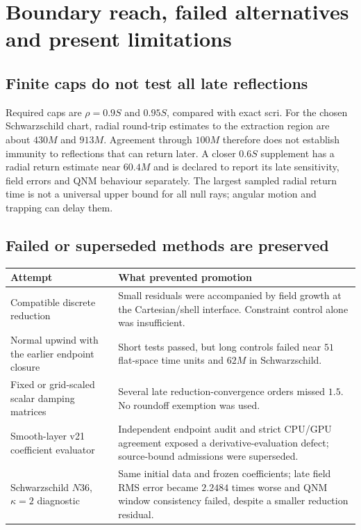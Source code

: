 \documentclass[11pt,letterpaper]{article}
\begin{document}
\clearpage
\section{Boundary reach, failed alternatives and present limitations}
\subsection{Finite caps do not test all late reflections}
Required caps are $\rho=0.9S$ and $0.95S$, compared with exact scri. For the chosen Schwarzschild chart, radial round-trip estimates to the extraction region are about $430M$ and $913M$. Agreement through $100M$ therefore does not establish immunity to reflections that can return later. A closer $0.6S$ supplement has a radial return estimate near $60.4M$ and is declared to report its late sensitivity, field errors and QNM behaviour separately. The largest sampled radial return time is not a universal upper bound for all null rays; angular motion and trapping can delay them.

\subsection{Failed or superseded methods are preserved}
\begin{center}\small
\begin{tabularx}{\linewidth}{@{}p{3.4cm}X@{}}\toprule
Attempt & What prevented promotion \\\midrule
Compatible discrete reduction & Small residuals were accompanied by field growth at the Cartesian/shell interface. Constraint control alone was insufficient. \\
Normal upwind with the earlier endpoint closure & Short tests passed, but long controls failed near $51$ flat-space time units and $62M$ in Schwarzschild. \\
Fixed or grid-scaled scalar damping matrices & Several late reduction-convergence orders missed $1.5$. No roundoff exemption was used. \\
Smooth-layer v21 coefficient evaluator & Independent endpoint audit and strict CPU/GPU agreement exposed a derivative-evaluation defect; source-bound admissions were superseded. \\
Schwarzschild $N36$, $\kappa=2$ diagnostic & Same initial data and frozen coefficients; late field RMS error became $2.2484$ times worse and QNM window consistency failed, despite a smaller reduction residual. \\\bottomrule
\end{tabularx}\end{center}
\end{document}
